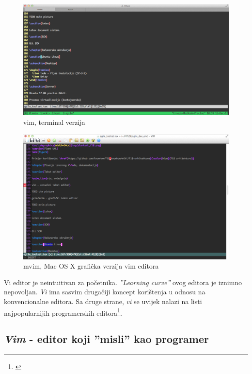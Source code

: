 \documentclass[times, utf8, seminar]{fit}
\begin{document}
\begin{figure}[H]
\centering
\includegraphics[width=14cm]{img/vim.png}
\caption{vim, terminal verzija}
\end{figure}

\begin{figure}[H]
\centering
\includegraphics[width=14cm]{img/mvim.png}
\caption{mvim, Mac OS X grafička verzija vim editora}
\end{figure}

Vi editor je neintuitivan za početnika. \emph{''Learning curve''} ovog editora je iznimno nepovoljan. \emph{Vi} ima sasvim drugačiji koncept korištenja u odnosu na konvencionalne editora. Sa druge strane, \emph{vi} se uvijek nalazi na listi najpopularnijih programerskih editora\footnote{\href{http://tutorialzine.com/2012/07/battle-of-the-tools-which-is-the-best-code-editor}{\color{blue}{Pregled programerskih editora}}}.

\subsection{\emph{Vim} - editor koji ''misli'' kao programer}
\end{document}
